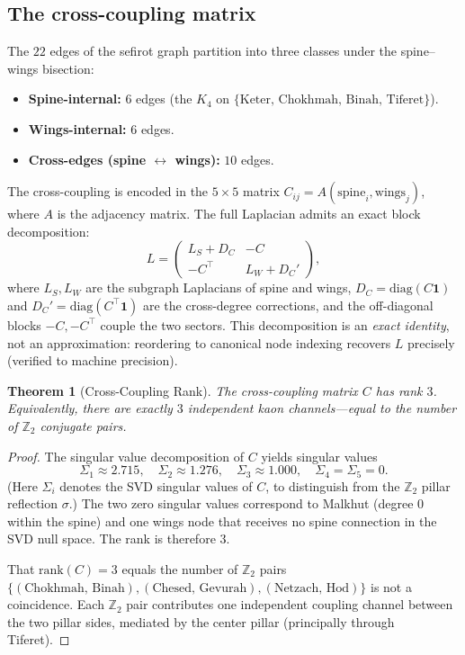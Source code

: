 \documentclass[11pt,a4paper]{amsart}
\newtheorem{theorem}{Theorem}[section]
\theoremstyle{remark}
\newcommand{\bbZ}{\mathbb{Z}}
\newcommand{\rank}{\mathrm{rank}}
\begin{document}
\subsection{The cross-coupling matrix}
\label{sec:cross-coupling}

The $22$ edges of the sefirot graph partition into three classes under the
spine--wings bisection:
\begin{itemize}[leftmargin=*]
\item \textbf{Spine-internal:} $6$ edges (the $K_4$ on
  $\{\text{Keter, Chokhmah, Binah, Tiferet}\}$).
\item \textbf{Wings-internal:} $6$ edges.
\item \textbf{Cross-edges (spine $\leftrightarrow$ wings):} $10$ edges.
\end{itemize}

The cross-coupling is encoded in the $5 \times 5$ matrix
$C_{ij} = A(\text{spine}_i, \text{wings}_j)$, where $A$ is the adjacency
matrix. The full Laplacian admits an exact block decomposition:
\begin{equation}
L = \begin{pmatrix} L_S + D_C & -C \\ -C^\top & L_W + D_C' \end{pmatrix},
\end{equation}
where $L_S, L_W$ are the subgraph Laplacians of spine and wings,
$D_C = \mathrm{diag}(C \mathbf{1})$ and $D_C' = \mathrm{diag}(C^\top \mathbf{1})$
are the cross-degree corrections, and the off-diagonal blocks $-C, -C^\top$
couple the two sectors. This decomposition is an \emph{exact identity},
not an approximation: reordering to canonical node indexing recovers $L$
precisely (verified to machine precision).

\begin{theorem}[Cross-Coupling Rank]
\label{thm:cross-coupling}
The cross-coupling matrix $C$ has rank $3$. Equivalently, there are exactly
$3$ independent kaon channels---equal to the number of $\bbZ_2$ conjugate
pairs.
\end{theorem}

\begin{proof}
The singular value decomposition of $C$ yields singular values
\begin{equation}
\Sigma_1 \approx 2.715, \quad \Sigma_2 \approx 1.276, \quad
\Sigma_3 \approx 1.000, \quad \Sigma_4 = \Sigma_5 = 0.
\end{equation}
(Here $\Sigma_i$ denotes the SVD singular values of $C$, to distinguish from
the $\bbZ_2$ pillar reflection $\sigma$.) The two zero singular values
correspond to Malkhut (degree $0$ within the spine) and one wings node that
receives no spine connection in the SVD null space. The rank is therefore
$3$.

That $\rank(C) = 3$ equals the number of $\bbZ_2$ pairs
$\{(\text{Chokhmah, Binah}), (\text{Chesed, Gevurah}), (\text{Netzach, Hod})\}$
is not a coincidence. Each $\bbZ_2$ pair contributes one independent
coupling channel between the two pillar sides, mediated by the center
pillar (principally through Tiferet).
\end{proof}
\end{document}
